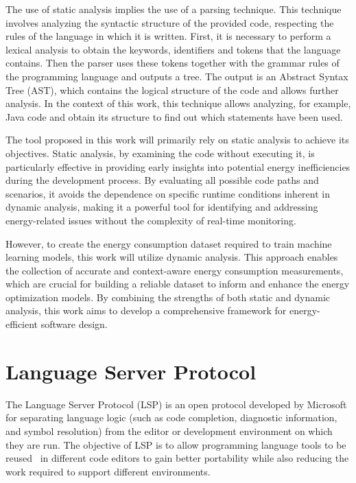 The use of static analysis implies the use of a parsing technique. This technique involves analyzing the syntactic structure of the provided code, respecting the rules of the language in which it is written. First, it is necessary to perform a lexical analysis to obtain the keywords, identifiers and tokens that the language contains. Then the parser uses these tokens together with the grammar rules of the programming language and outputs a tree. The output is an Abstract Syntax Tree (AST), which contains the logical structure of the code and allows further analysis. In the context of this work, this technique allows analyzing, for example, Java code and obtain its structure to find out which statements have been used.


The tool proposed in this work will primarily rely on static analysis to achieve its objectives. Static analysis, by examining the code without executing it, is particularly effective in providing early insights into potential energy inefficiencies during the development process. By evaluating all possible code paths and scenarios, it avoids the dependence on specific runtime conditions inherent in dynamic analysis, making it a powerful tool for identifying and addressing energy-related issues without the complexity of real-time monitoring.

However, to create the energy consumption dataset required to train machine learning models, this work will utilize dynamic analysis. This approach enables the collection of accurate and context-aware energy consumption measurements, which are crucial for building a reliable dataset to inform and enhance the energy optimization models. By combining the strengths of both static and dynamic analysis, this work aims to develop a comprehensive framework for energy-efficient software design.


\section{Language Server Protocol} \label{sec:background_lsp}

The Language Server Protocol (LSP) is an open protocol developed by Microsoft for separating language logic (such as code completion, diagnostic information, and symbol resolution) from the editor or development environment on which they are run. The objective of LSP is to allow programming language tools to be reused~\cite{10.1145/3550355.3552452} in different code editors to gain better portability while also reducing the work required to support different environments.

